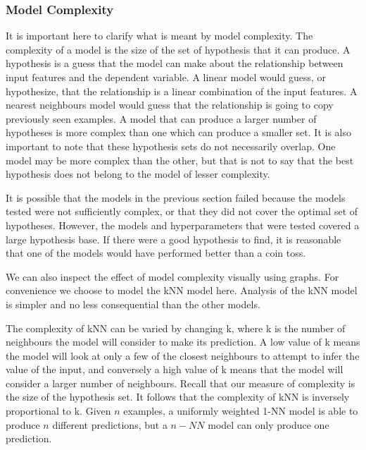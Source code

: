 \documentclass{report}
\begin{document}
\subsubsection{Model Complexity}

It is important here to clarify what is meant by model complexity. The complexity of a model is the size of the set of hypothesis that it can produce. A hypothesis is a guess that the model can make about the relationship between input features and the dependent variable. A linear model would guess, or hypothesize, that the relationship is a linear combination of the input features. A nearest neighbours model would guess that the relationship is going to copy previously seen examples. A model that can produce a larger number of hypotheses is more complex than one which can produce a smaller set. It is also important to note that these hypothesis sets do not necessarily overlap. One model may be more complex than the other, but that is not to say that the best hypothesis does not belong to the model of lesser complexity.



It is possible that the models in the previous section failed because the models tested were not sufficiently complex, or that they did not cover the optimal set of hypotheses. However, the models and hyperparameters that were tested covered a large hypothesis base. If there were a good hypothesis to find, it is reasonable that one of the models would have performed better than a coin toss.

We can also inspect the effect of model complexity visually using graphs. For convenience we choose to model the kNN model here. Analysis of the kNN model is simpler and no less consequential than the other models.

The complexity of kNN can be varied by changing k, where k is the number of neighbours the model will consider to make its prediction. A low value of k means the model will look at only a few of the closest neighbours to attempt to infer the value of the input, and conversely a high value of k means that the model will consider a larger number of neighbours. Recall that our measure of complexity is the size of the hypothesis set. It follows that the complexity of kNN is inversely proportional to k. Given $n$ examples, a uniformly weighted 1-NN model is able to produce $n$ different predictions, but a $n-NN$ model can only produce one prediction.
\end{document}
